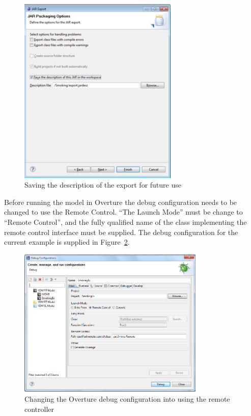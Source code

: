 \documentclass{overturerepchap}
\begin{document}
\begin{figure}[h]
\begin{center}
  \includegraphics[width=3in]{figures/SmokersSaveExport}
  \caption[labelInTOC]{Saving the description of the export for future use}
  \label{fig:gui:SaveExport}
\end{center}
\end{figure}

Before running the model in Overture the debug configuration needs to be changed to use the Remote Control. ``The Launch Mode'' must be change to ``Remote Control'', and the fully qualified name of the class implementing the remote control interface must be supplied. The debug configuration for the current example is supplied in Figure~\ref{fig:gui:DebugConfiguration}. \\

\begin{figure}[h]
\begin{center}
  \includegraphics[width=3.5in]{figures/SmokersDebugConfig}
  \caption[labelInTOC]{Changing the Overture debug configuration into using the remote controller}
  \label{fig:gui:DebugConfiguration}
\end{center}
\end{figure}
\end{document}
